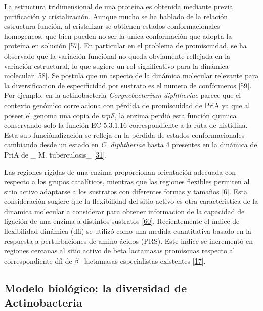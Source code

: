 \documentclass[12pt,twoside]{reedthesis}
\begin{document}
  La estructura tridimensional de una proteína es obtenida mediante previa
  purificación y cristalización. Aunque mucho se ha hablado de la relación
  estructura función, al cristalizar se obtienen estados conformacionales
  homogeneos, que bien pueden no ser la unica conformación que adopta la
  proteína en solución
  {[}\protect\hyperlink{ref-james_conformational_2003}{57}{]}. En
  particular en el problema de promiscuidad, se ha observado que la
  variación funciónal no queda obviamente reflejada en la variación
  estructural, lo que sugiere un rol significativo para la dinámica
  molecular {[}\protect\hyperlink{ref-parisi_conformational_2015}{58}{]}.
  Se postula que un aspecto de la dinámica molecular relevante para la
  diversificacion de especificidad por sustrato es el numero de
  confórmeros {[}\protect\hyperlink{ref-javier_zea_protein_2013}{59}{]}.
  Por ejemplo, en la actinobacteria \emph{Corynebacterium diphtheriae}
  parece que el contexto genómico correlaciona con pérdida de promiscuidad
  de PriA ya que al poseer el genoma una copia de \emph{trpF}, la enzima
  perdió esta función quimica conservando solo la función EC 5.3.1.16
  correspondiente a la ruta de histidina. Esta sub-funciónalización se
  refleja en la pérdida de estados conformacionales cambiando desde un
  estado en \emph{C. diphtheriae} hasta 4 presentes en la dinámica de PriA
  de \_ M. tuberculosis\_
  {[}\protect\hyperlink{ref-noda-garcia_evolution_2013}{31}{]}.
  
  Las regiones rígidas de una enzima proporcionan orientación adecuada con
  respecto a los grupos catalíticos, mientras que las regiones flexibles
  permiten al sitio activo adaptarse a los sustratos con diferentes formas
  y tamaños {[}\protect\hyperlink{ref-copley_enzymes_2003}{6}{]}. Esta
  consideración sugiere que la flexibilidad del sitio activo es otra
  caracteristica de la dinamica molecular a considerar para obtener
  informacion de la capacidad de ligación de una enzima a distintos
  sustratos
  {[}\protect\hyperlink{ref-gatti-lafranconi_flexibility_2013}{60}{]}.
  Recientemente el índice de flexibilidad dinámica (dfi) se utilizó como
  una medida cuantitativa basado en la respuesta a perturbaciones de amino
  ácidos (PRS). Este indice se incrementó en regiones cercanas al sitio
  activo de beta lactamasas promiscuas respecto al correspondiente dfi de
  \(\noindent\beta\) -lactamasas especialistas existentes
  {[}\protect\hyperlink{ref-zou_evolution_2015}{17}{]}.
  
  \subsection{Modelo biológico: la diversidad de
  Actinobacteria}\label{modelo-biologico-la-diversidad-de-actinobacteria}
  
\end{document}
